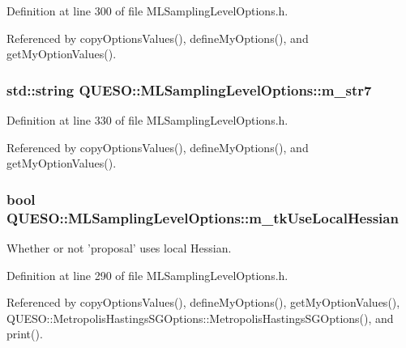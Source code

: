 Definition at line 300 of file M\-L\-Sampling\-Level\-Options.\-h.



Referenced by copy\-Options\-Values(), define\-My\-Options(), and get\-My\-Option\-Values().

\hypertarget{class_q_u_e_s_o_1_1_m_l_sampling_level_options_a062489e53dd259c548d7ea9ed9428377}{
\subsubsection[{m\-\_\-str7}]{\setlength{\rightskip}{0pt plus 5cm}std\-::string Q\-U\-E\-S\-O\-::\-M\-L\-Sampling\-Level\-Options\-::m\-\_\-str7}}\label{class_q_u_e_s_o_1_1_m_l_sampling_level_options_a062489e53dd259c548d7ea9ed9428377}


Definition at line 330 of file M\-L\-Sampling\-Level\-Options.\-h.



Referenced by copy\-Options\-Values(), define\-My\-Options(), and get\-My\-Option\-Values().

\hypertarget{class_q_u_e_s_o_1_1_m_l_sampling_level_options_a981084edf651ff9db5dd56a36ef54a61}{
\subsubsection[{m\-\_\-tk\-Use\-Local\-Hessian}]{\setlength{\rightskip}{0pt plus 5cm}bool Q\-U\-E\-S\-O\-::\-M\-L\-Sampling\-Level\-Options\-::m\-\_\-tk\-Use\-Local\-Hessian}}\label{class_q_u_e_s_o_1_1_m_l_sampling_level_options_a981084edf651ff9db5dd56a36ef54a61}


Whether or not 'proposal' uses local Hessian. 



Definition at line 290 of file M\-L\-Sampling\-Level\-Options.\-h.



Referenced by copy\-Options\-Values(), define\-My\-Options(), get\-My\-Option\-Values(), Q\-U\-E\-S\-O\-::\-Metropolis\-Hastings\-S\-G\-Options\-::\-Metropolis\-Hastings\-S\-G\-Options(), and print().

